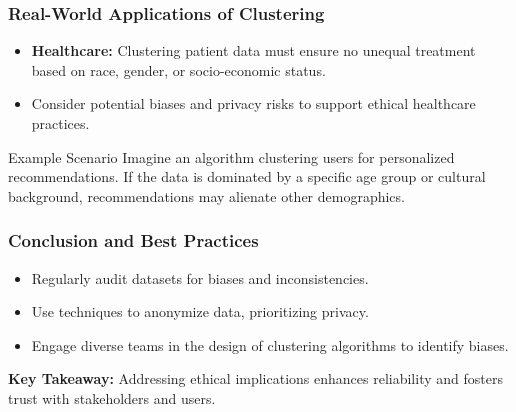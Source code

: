 \documentclass[aspectratio=169]{beamer}
\begin{document}
\begin{frame}[fragile]
    \frametitle{Real-World Applications of Clustering}
    \begin{itemize}
        \item \textbf{Healthcare:} Clustering patient data must ensure no unequal treatment based on race, gender, or socio-economic status.
        \item Consider potential biases and privacy risks to support ethical healthcare practices.
    \end{itemize}
    
    \begin{block}{Example Scenario}
        Imagine an algorithm clustering users for personalized recommendations. If the data is dominated by a specific age group or cultural background, recommendations may alienate other demographics. 
    \end{block}
\end{frame}

\begin{frame}[fragile]
    \frametitle{Conclusion and Best Practices}
    \begin{itemize}
        \item Regularly audit datasets for biases and inconsistencies.
        \item Use techniques to anonymize data, prioritizing privacy.
        \item Engage diverse teams in the design of clustering algorithms to identify biases.
    \end{itemize}
    
    \textbf{Key Takeaway:} Addressing ethical implications enhances reliability and fosters trust with stakeholders and users.
\end{frame}
\end{document}
